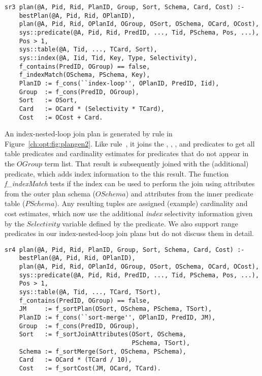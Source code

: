 \begin{figure*}
\ssp
\centering
\begin{lstlisting}
sr3 plan(@A, Pid, Rid, PlanID, Group, Sort, Schema, Card, Cost) :-
    bestPlan(@A, Pid, Rid, OPlanID),
    plan(@A, Pid, Rid, OPlanId, OGroup, OSort, OSchema, OCard, OCost),
    sys::predicate(@A, Pid, Rid, PredID, ..., Tid, PSchema, Pos, ...),
    Pos > 1,
    sys::table(@A, Tid, ..., TCard, Sort),
    sys::index(@A, Iid, Tid, Key, Type, Selectivity),
    f_contains(PredID, OGroup) == false,
    f_indexMatch(OSchema, PSchema, Key),
    PlanID := f_cons(``index-loop'', OPlanID, PredID, Iid),
    Group  := f_cons(PredID, OGroup),
    Sort   := OSort,
    Card   := OCard * (Selectivity * TCard),
    Cost   := OCost + Card.
\end{lstlisting}
\caption{\label{ch:opt:fig:plangen2}index-nested-loop join method.}
\end{figure*}

An index-nested-loop join plan is generated by rule  in
Figure~\ref{ch:opt:fig:plangen2}.  Like rule~, it joins the
, , , and  predicates
to get all table predicates and cardinality estimates for predicates that do
not appear in the $OGroup$ term list.  That result is subsequently joined with
the (additional)  predicate, which adds index information to the
this result.  The function {\em f\_indexMatch} tests if the index can be used
to perform the join using attributes from the outer plan schema ($OSchema$) and
attributes from the inner predicate table ($PSchema$).  Any resulting tuples
are assigned (example) cardinality and cost estimates, which now use the
additional {\em index} selectivity information given by the $Selectivity$
variable defined by the  predicate.  We also support range
predicates in our index-nested-loop join plans but do not discuss them in
detail.

\begin{figure*}
\ssp
\centering
\begin{lstlisting}
sr4 plan(@A, Pid, Rid, PlanID, Group, Sort, Schema, Card, Cost) :-
    bestPlan(@A, Pid, Rid, OPlanID),
    plan(@A, Pid, Rid, OPlanId, OGroup, OSort, OSchema, OCard, OCost),
    sys::predicate(@A, Pid, Rid, PredID, ..., Tid, PSchema, Pos, ...),
    Pos > 1,
    sys::table(@A, Tid, ..., TCard, TSort),
    f_contains(PredID, OGroup) == false,
    JM     := f_sortPlan(OSort, OSchema, PSchema, TSort),
    PlanID := f_cons(``sort-merge'', OPlanID, PredID, JM),
    Group  := f_cons(PredID, OGroup),
    Sort   := f_sortJoinAttributes(OSort, OSchema, 
                                   PSchema, TSort),
    Schema := f_sortMerge(Sort, OSchema, PSchema),
    Card   := OCard * (TCard / 10),
    Cost   := f_sortCost(JM, OCard, TCard).
\end{lstlisting}
\caption{\label{ch:opt:fig:plangen3}sort-merge join method.}
\end{figure*}

